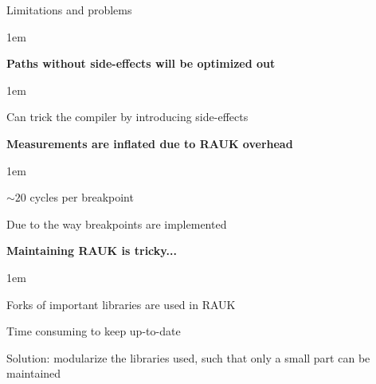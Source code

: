 \begin{frame}{Limitations and problems}
    \begin{itemize-size}{1em}
            \item \textbf{Paths without side-effects will be optimized out}
                \begin{itemize-size}{1em}
                    \item Can trick the compiler by introducing side-effects
                \end{itemize-size}
            \item \textbf{Measurements are inflated due to RAUK overhead}
                \begin{itemize-size}{1em}
                    \item $\sim20$ cycles per breakpoint
                    \item Due to the way breakpoints are implemented
                \end{itemize-size}
            \item \textbf{Maintaining RAUK is tricky...}
                \begin{itemize-size}{1em}
                    \item Forks of important libraries are used in RAUK
                    \item Time consuming to keep up-to-date
                    \item Solution: modularize the libraries used, such
                    that only a small part can be maintained
                \end{itemize-size}
        \end{itemize-size}
\end{frame}
